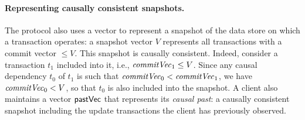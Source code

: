 \paragraph{Representing causally consistent snapshots.}
The protocol also uses a vector to represent a snapshot of the data store on
which a transaction operates: a snapshot vector $V$ represents all transactions
with a commit vector $\le V$. This snapshot is causally consistent. Indeed,
consider a transaction $t_1$ included into it, i.e., $\commitvector_1 \leq
V$. Since any causal dependency $t_0$ of $t_1$ is such that
$\commitvector_0 < \commitvector_1$, we have $\commitvector_0 < V$, so that
$t_0$ is also included into the snapshot. A client also maintains a vector
${\sf pastVec}$
that represents its \emph{causal past}: a causally consistent snapshot including
the update transactions the client has previously observed.



